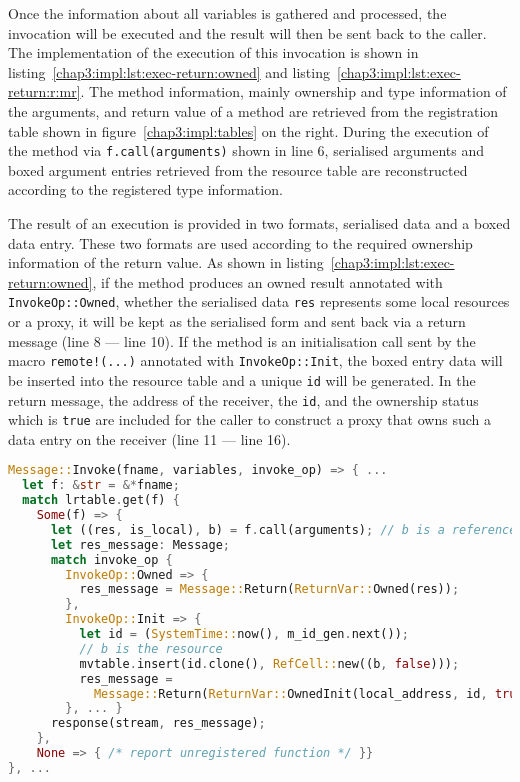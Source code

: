 Once the information about all variables is gathered and processed, the invocation will be executed and the result will then be sent back to the caller. The implementation of the execution of this invocation is shown in listing~\ref{chap3:impl:lst:exec-return:owned} and listing~\ref{chap3:impl:lst:exec-return:r:mr}. The method information, mainly ownership and type information of the arguments, and return value of a method are retrieved from the registration table shown in figure~\ref{chap3:impl:tables} on the right. During the execution of the method via \texttt{f.call(arguments)} shown in line 6, serialised arguments and boxed argument entries retrieved from the resource table are reconstructed according to the registered type information.

The result of an execution is provided in two formats, serialised data and a boxed data entry. These two formats are used according to the required ownership information of the return value. 
As shown in listing~\ref{chap3:impl:lst:exec-return:owned}, if the method produces an owned result annotated with \texttt{InvokeOp::Owned}, whether the serialised data \texttt{res} represents some local resources or a proxy, it will be kept as the serialised form and sent back via a return message (line 8 --- line 10). If the method is an initialisation call sent by the macro \texttt{remote!(...)} annotated with \texttt{InvokeOp::Init}, the boxed entry data will be inserted into the resource table and a unique \texttt{id} will be generated. In the return message, the address of the receiver, the \texttt{id}, and the ownership status which is \texttt{true} are included for the caller to construct a proxy that owns such a data entry on the receiver (line 11 --- line 16).
\begin{lstlisting}[language=Rust, style=boxed, basicstyle=\footnotesize\ttfamily, caption={Executing an invocation and returning the result: \texttt{Owned} and \texttt{Init}}, label=chap3:impl:lst:exec-return:owned]
Message::Invoke(fname, variables, invoke_op) => { ...
  let f: &str = &*fname; 
  match lrtable.get(f) {
    Some(f) => {
      let ((res, is_local), b) = f.call(arguments); // b is a reference
      let res_message: Message;
      match invoke_op {
        InvokeOp::Owned => { 
          res_message = Message::Return(ReturnVar::Owned(res)); 
        },
        InvokeOp::Init => {
          let id = (SystemTime::now(), m_id_gen.next());
          // b is the resource
          mvtable.insert(id.clone(), RefCell::new((b, false)));
          res_message = 
            Message::Return(ReturnVar::OwnedInit(local_address, id, true));
        }, ... }
      response(stream, res_message);
    },
    None => { /* report unregistered function */ }}
}, ...
\end{lstlisting}

